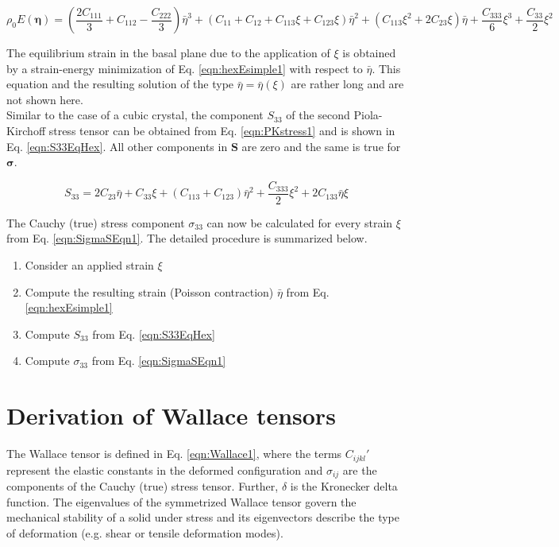 \documentclass[showpacs,aps,floatfix,prb,reprint,superscriptaddress,onecolumn]{revtex4-1}
\begin{document}
\begin{equation}
\label{eqn:hexEsimple1} 
\rho_{0} E \left(\bm{\eta}\right) = \left(\frac{2 C_{111}}{3} + C_{112} - \frac{C_{222}}{3}\right)\bar{\eta}^{3} + \left(C_{11} + C_{12} + C_{113} \xi + C_{123} \xi \right) \bar{\eta}^{2} + \left(C_{113} \xi^{2} + 2 C_{23} \xi  \right) \bar{\eta} +  \frac{C_{333}}{6}\xi^{3} + \frac{C_{33}}{2} \xi^{2}
\end{equation}

The equilibrium strain in the basal plane due to the application of $\xi$ is obtained by a strain-energy minimization of Eq. \ref{eqn:hexEsimple1} with respect to $\bar{\eta}$. This equation and the resulting solution of the type $\bar{\eta} = \bar{\eta}\left(\xi \right)$ are rather long and are not shown here. \\

Similar to the case of a cubic crystal, the component $S_{33}$ of the second Piola-Kirchoff stress tensor can be obtained from Eq. \ref{eqn:PKstress1} and is shown in Eq. \ref{eqn:S33EqHex}. All other components in $\mathbf{S}$ are zero and the same is true for $\mathbf{\sigma}$.

\begin{equation}
\label{eqn:S33EqHex} 
S_{33} = 2 C_{23} \bar{\eta} + C_{33} \xi + \left(C_{113}+C_{123}\right) \bar{\eta}^{2} + \frac{C_{333}}{2}\xi^{2} + 2 C_{133} \bar{\eta} \xi
\end{equation}

The Cauchy (true) stress component $\sigma_{33}$ can now be calculated for every strain $\xi$ from Eq. \ref{eqn:SigmaSEqn1}. The detailed procedure is summarized below. 

\newpage

\begin{enumerate}
\itemsep-0.0em 
\item Consider an applied strain $\xi$
\item Compute the resulting strain (Poisson contraction) $\bar{\eta}$ from Eq. \ref{eqn:hexEsimple1}
\item Compute $S_{33}$ from Eq. \ref{eqn:S33EqHex}
\item Compute $\sigma_{33}$ from Eq. \ref{eqn:SigmaSEqn1}
\end{enumerate}


\section{Derivation of Wallace tensors}
The Wallace tensor is defined in Eq. \ref{eqn:Wallace1}, where the terms $C_{ijkl}'$ represent the elastic constants in the deformed configuration and $\sigma_{ij}$ are the components of the Cauchy (true) stress tensor. Further, $\delta$ is the Kronecker delta function. The eigenvalues of the symmetrized Wallace tensor govern the mechanical stability of a solid under stress and its eigenvectors describe the type of deformation (e.g. shear or tensile deformation modes). \\
\end{document}
